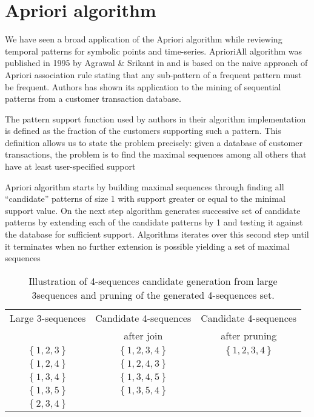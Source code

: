 \section{Apriori algorithm}
We have seen a broad application of the Apriori algorithm while reviewing temporal patterns for symbolic points and time-series. AprioriAll algorithm was published in 1995 by Agrawal \& Srikant in \cite{citeulike:775528} and is based on the naive approach of Apriori association rule stating that any sub-pattern of a frequent pattern must be frequent. Authors has shown its application to the mining of sequential patterns from a customer transaction database. 

The pattern support function used by authors in their algorithm implementation is defined as the fraction of the customers supporting such a pattern. This definition allows us to state the problem precisely: given a database of customer transactions, the problem is to find the maximal sequences among all others that have at least user-specified support

Apriori algorithm starts by building maximal sequences through finding all ``candidate'' patterns of size 1 with support greater or equal to the minimal support value. On the next step algorithm generates successive set of candidate patterns by extending each of the candidate patterns by 1 and testing it against the database for sufficient support. Algorithms iterates over this second step until it terminates when no further extension is possible yielding a set of maximal sequences

\begin{table}
\begin{center}
    \begin{tabular}{ | c | c | c |}
    \hline
    Large 3-sequences & Candidate 4-sequences                     & Candidate 4-sequences \\ 
                      & after join                                & after pruning \\ 
    \hline
    $\left\{ 1, 2, 3 \right\} $ & $ \left\{ 1, 2, 3, 4 \right\} $ & $ \left\{ 1, 2, 3, 4 \right\} $ \\ 
    \hline
    $\left\{ 1, 2, 4 \right\} $ & $ \left\{ 1, 2, 4, 3 \right\} $ & \\ 
    \hline
    $\left\{ 1, 3, 4 \right\} $ & $ \left\{ 1, 3, 4, 5 \right\} $ & \\ 
    \hline
    $\left\{ 1, 3, 5 \right\} $ & $ \left\{ 1, 3, 5, 4 \right\} $ & \\ 
    \hline
    $\left\{ 2, 3, 4 \right\} $  &                                & \\ 
    \hline
    \end{tabular}
    \caption{Illustration of 4-sequences candidate generation from large 3sequences and pruning of the generated 4-sequences set.}
    \label{fig:apriori}
    \end{center}
\end{table}

